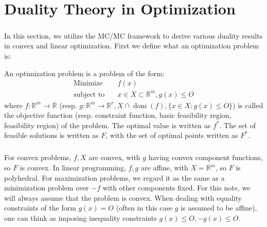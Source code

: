 \chapter{Duality Theory in Optimization}
\label{chap:04}

\paragraph{}In this section, we utilize the MC/MC framework to derive various duality results in convex and linear optimization. First we define what an optimization problem is:

\begin{defn}\label{defn:040-opt-prob}
	An optimization problem is a problem of the form:
	\begin{align*}
		\text{Minimize}\quad   & f(x)                                   \\
		\text{subject to}\quad & x\in X\subset \mathbb{R}^m, g(x)\leq O
	\end{align*}
	where $f:\mathbb{R}^m\to \overline{\mathbb{R}}$ (resp. $g:\mathbb{R}^m\to \mathbb{R}^r,X\cap \operatorname{dom}(f),\{x\in X:g(x)\leq O\}$) is called the objective function (resp. constraint function, basic feasibility region, feasibility region) of the problem. The optimal value is written as $f^\ast$. The set of feasible solutions is written as $F$, with the set of optimal points written as $F^\ast$.
\end{defn}

\paragraph{}For convex problems, $f,X$ are convex, with $g$ having convex component functions, so $F$ is convex. In linear programming, $f,g$ are affine, with $X=\mathbb{R}^m$, so $F$ is polyhedral. For maximization problems, we regard it as the same as a minimization problem over $-f$ with other components fixed. For this note, we will always assume that the problem is convex. When dealing with equality constraints of the form $g(x)=O$ (often in this case $g$ is assumed to be affine), one can think as imposing inequality constraints $g(x)\leq O,-g(x)\leq O$.







